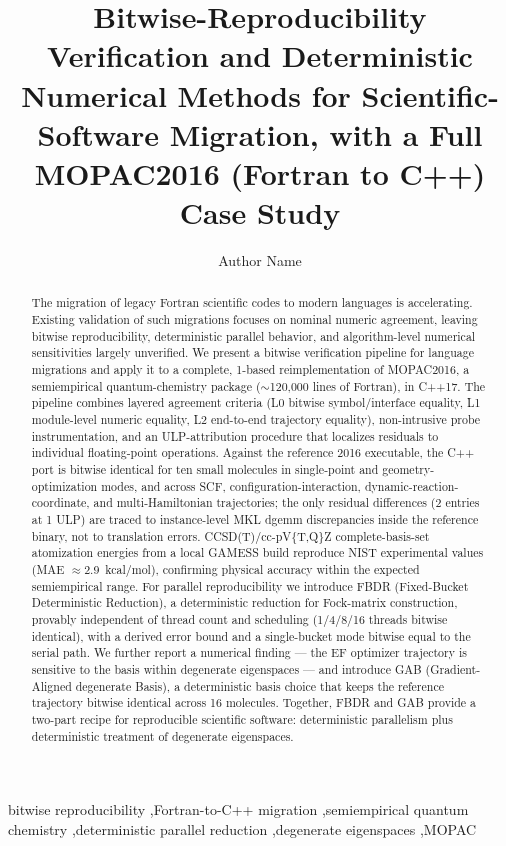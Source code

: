 \documentclass[preprint,12pt]{elsarticle}
\begin{document}
\begin{frontmatter}

\title{Bitwise-Reproducibility Verification and Deterministic Numerical Methods for Scientific-Software Migration, with a Full MOPAC2016 (Fortran to C++) Case Study}

\author[aff1]{Author Name}

\begin{abstract}
The migration of legacy Fortran scientific codes to modern languages is accelerating. Existing validation of such migrations focuses on nominal numeric agreement, leaving bitwise reproducibility, deterministic parallel behavior, and algorithm-level numerical sensitivities largely unverified. We present a bitwise verification pipeline for language migrations and apply it to a complete, 1-based reimplementation of MOPAC2016, a semiempirical quantum-chemistry package ($\sim$120{,}000 lines of Fortran), in C++17. The pipeline combines layered agreement criteria (L0 bitwise symbol/interface equality, L1 module-level numeric equality, L2 end-to-end trajectory equality), non-intrusive probe instrumentation, and an ULP-attribution procedure that localizes residuals to individual floating-point operations. Against the reference 2016 executable, the C++ port is bitwise identical for ten small molecules in single-point and geometry-optimization modes, and across SCF, configuration-interaction, dynamic-reaction-coordinate, and multi-Hamiltonian trajectories; the only residual differences (2 entries at 1 ULP) are traced to instance-level MKL dgemm discrepancies inside the reference binary, not to translation errors. CCSD(T)/cc-pV\{T,Q\}Z complete-basis-set atomization energies from a local GAMESS build reproduce NIST experimental values (MAE $\approx$2.9~kcal/mol), confirming physical accuracy within the expected semiempirical range. For parallel reproducibility we introduce FBDR (Fixed-Bucket Deterministic Reduction), a deterministic reduction for Fock-matrix construction, provably independent of thread count and scheduling (1/4/8/16 threads bitwise identical), with a derived error bound and a single-bucket mode bitwise equal to the serial path. We further report a numerical finding --- the EF optimizer trajectory is sensitive to the basis within degenerate eigenspaces --- and introduce GAB (Gradient-Aligned degenerate Basis), a deterministic basis choice that keeps the reference trajectory bitwise identical across 16 molecules. Together, FBDR and GAB provide a two-part recipe for reproducible scientific software: deterministic parallelism plus deterministic treatment of degenerate eigenspaces.
\end{abstract}

\begin{keyword}
bitwise reproducibility \sep Fortran-to-C++ migration \sep semiempirical quantum chemistry \sep deterministic parallel reduction \sep degenerate eigenspaces \sep MOPAC
\end{keyword}

\end{frontmatter}
\end{document}
